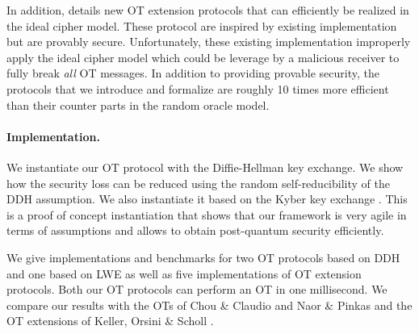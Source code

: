 In addition,  details new OT extension protocols that can efficiently be realized in the ideal cipher model. These protocol are inspired by existing implementation \cite{libOTe,KOS,EMP} but are provably secure. Unfortunately, these existing implementation improperly apply the ideal cipher model which could be leverage by a malicious receiver to fully break \emph{all} OT messages. In addition to providing provable security, the protocols that we introduce and formalize are roughly 10 times more efficient than their counter parts in the random oracle model.


\paragraph{Implementation.} We instantiate our OT protocol with the Diffie-Hellman key exchange. We show how the security loss can be reduced using the random self-reducibility of the DDH assumption. 
We also instantiate it based on the Kyber key exchange \cite{EPRINT:BDKLLS17,NISTPQC-R1:CRYSTALS-KYBER17}. This is a proof of concept instantiation that shows that our framework is very agile in terms of assumptions and allows to obtain post-quantum security efficiently. 

We give implementations and benchmarks for two OT protocols based on DDH and one based on LWE as well as five implementations of OT extension protocols. Both our OT protocols can perform an OT in one millisecond. We compare our results with the OTs of Chou \& Claudio \cite{LC:ChoOrl15} and Naor \& Pinkas \cite{SODA:NaoPin01} and the OT extensions of Keller, Orsini \& Scholl \cite{C:KelOrsSch15}. 